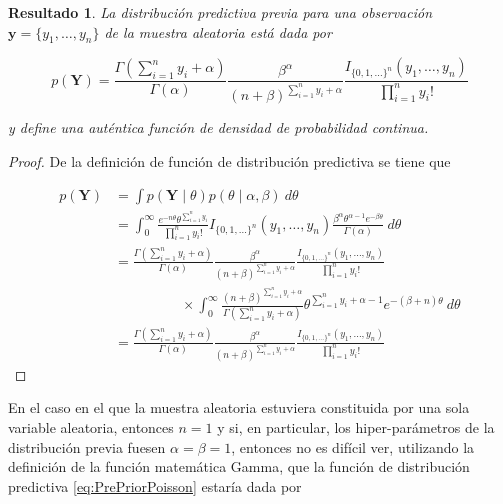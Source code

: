 \documentclass[
  12pt,
  spanish,
]{book}
\newtheorem{proposition}{Resultado}[chapter]
\theoremstyle{definition}
\theoremstyle{definition}
\theoremstyle{definition}
\theoremstyle{definition}
\theoremstyle{remark}
\begin{document}
\begin{proposition}
\protect\hypertarget{prp:unnamed-chunk-44}{}{\label{prp:unnamed-chunk-44} }La distribución predictiva previa para una observación \(\mathbf{y}=\{y_1,\ldots,y_n\}\) de la muestra aleatoria está dada por

\begin{equation}
\label{eq:PrePriorPoisson}
p(\mathbf{Y})=\frac{\Gamma(\sum_{i=1}^ny_i+\alpha)}{\Gamma(\alpha)}\frac{\beta^\alpha}{(n+\beta)^{\sum_{i=1}^ny_i+\alpha}}
\frac{I_{\{0,1,\ldots\}^n}(y_1,\ldots,y_n)}{\prod_{i=1}^ny_i!}
\end{equation}

y define una auténtica función de densidad de probabilidad continua.
\end{proposition}

\begin{proof}
\iffalse{} {Prueba. } \fi{}De la definición de función de distribución predictiva se tiene que

\begin{align*}
p(\mathbf{Y})&=\int p(\mathbf{Y} \mid \theta)p(\theta \mid \alpha,\beta)\ d\theta\\
&=\int_0^{\infty} \frac{e^{-n\theta}\theta^{\sum_{i=1}^ny_i}}{\prod_{i=1}^ny_i!}I_{\{0,1,\ldots\}^n}(y_1,\ldots,y_n)
\frac{\beta^\alpha \theta^{\alpha-1} e^{-\beta\theta}}{\Gamma(\alpha)}\ d\theta\\
&=\frac{\Gamma(\sum_{i=1}^ny_i+\alpha)}{\Gamma(\alpha)}\frac{\beta^\alpha}{(n+\beta)^{\sum_{i=1}^ny_i+\alpha}}
\frac{I_{\{0,1,\ldots\}^n}(y_1,\ldots,y_n)}{\prod_{i=1}^ny_i!}\\
&\hspace{2cm}\times
\int_0^{\infty} \frac{(n+\beta)^{\sum_{i=1}^ny_i+\alpha}}{\Gamma(\sum_{i=1}^ny_i+\alpha)}
\theta^{\sum_{i=1}^ny_i+\alpha-1}e^{-(\beta+n)\theta} \ d\theta\\
&=\frac{\Gamma(\sum_{i=1}^ny_i+\alpha)}{\Gamma(\alpha)}\frac{\beta^\alpha}{(n+\beta)^{\sum_{i=1}^ny_i+\alpha}}
\frac{I_{\{0,1,\ldots\}^n}(y_1,\ldots,y_n)}{\prod_{i=1}^ny_i!}
\end{align*}
\end{proof}

En el caso en el que la muestra aleatoria estuviera constituida por una sola variable aleatoria, entonces \(n=1\) y si, en particular, los hiper-parámetros de la distribución previa fuesen \(\alpha=\beta=1\), entonces no es difícil ver, utilizando la definición de la función matemática Gamma, que la función de distribución predictiva \eqref{eq:PrePriorPoisson} estaría dada por
\end{document}
